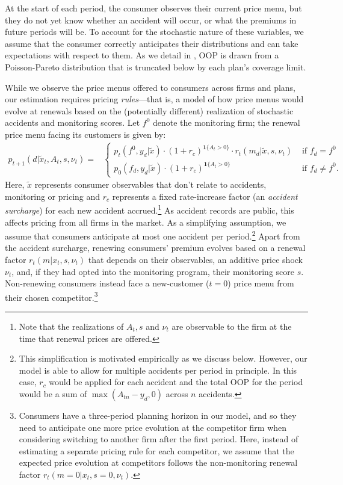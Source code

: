At the start of each period, the consumer observes their current price menu, but they do not yet know whether an accident will occur, or what the premiums in future periods will be. To account for the stochastic nature of these variables, we assume that the consumer correctly anticipates their distributions and can take expectations with respect to them. As we detail in , OOP is drawn from a Poisson-Pareto distribution that is truncated below by each plan's coverage limit.

While we observe the price menus offered to consumers across firms and plans, our estimation requires pricing \textit{rules}---that is, a model of how price menus would evolve at renewals based on the (potentially different) realization of stochastic accidents and monitoring scores.
Let $f^0$ denote the monitoring firm; the renewal price menu facing its customers is given by:
\begin{equation}\label{eq:renewal-rate-overview}
\begin{split}
    p_{t+1}(d | \tilde{x}_{t}, A_{t}, s, \nu_t) = &
    \begin{cases}
    p_t(f^0,y_d | \tilde{x}) \cdot (1+r_c)^{\mathbf{1}\{A_t > 0\}} \cdot r_t(m_d | \tilde{x}, s, \nu_t) & \text{ if }f_d=f^0\\
    p_0(f_d,y_d | \tilde{x}) \cdot (1+r_c)^{\mathbf{1}\{A_t > 0\}} & \text{ if }f_d\not=f^0.
    \end{cases}
\end{split}
\end{equation}
Here, $\tilde{x}$ represents consumer observables that don't relate to accidents, monitoring or pricing and $r_c$ represents a fixed rate-increase factor (an \textit{accident surcharge}) for each new accident accrued.\footnote{Note that the realizations of $A_t, s$ and $\nu_t$ are observable to the firm at the time that renewal prices are offered.} As accident records are public, this affects pricing from all firms in the market. As a simplifying assumption, we assume that consumers anticipate at most one accident per period.\footnote{This simplification is motivated empirically as we discuss below. However, our model is able to allow for multiple accidents per period in principle. In this case, $r_c$ would be applied for each accident and the total OOP for the period would be a sum of $\max(A_{tn} - y_{d}, 0)$ across $n$ accidents.} Apart from the accident surcharge, renewing consumers' premium evolves based on a {renewal factor} $r_t(m | x_t, s, \nu_t)$ that depends on their observables, an additive price shock $\nu_t$, and, if they had opted into the monitoring program, their monitoring score $s$. Non-renewing consumers instead face a new-customer ($t=0$) price menu from their chosen competitor.\footnote{Consumers have a three-period planning horizon in our model, and so they need to anticipate one more price evolution at the competitor firm when considering switching to another firm after the first period. Here, instead of estimating a separate pricing rule for each competitor, we assume that the expected price evolution at competitors follows the non-monitoring renewal factor $r_t(m=0|x_t,s=0,\nu_t)$.}

